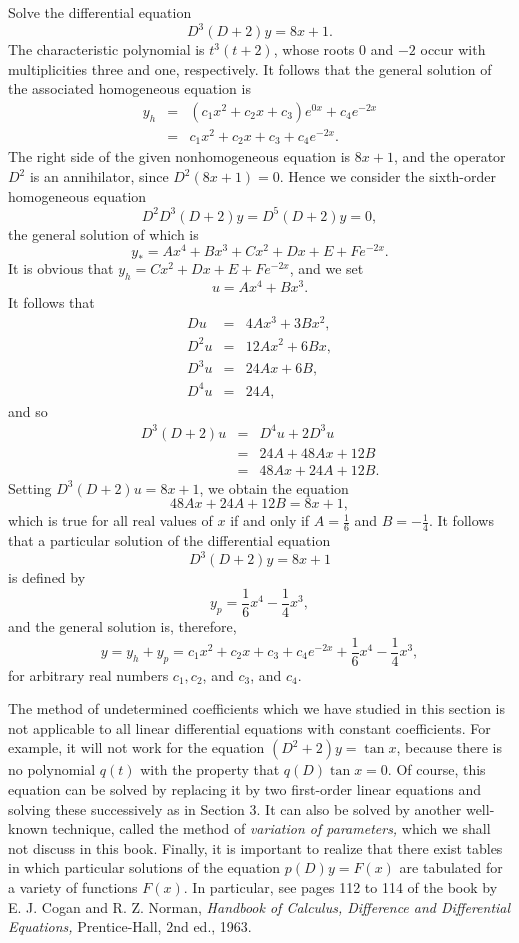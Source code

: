 \begin{example} Solve the differential equation
$$
D^3(D + 2)y = 8x + 1.
$$
The characteristic polynomial is $t^3(t + 2)$, whose roots 0 and $-2$ occur with multiplicities three and one, respectively. It follows that the general solution of the associated homogeneous equation is
\begin{eqnarray*}
y_h &=& (c_1x^2 + c_2x + c_3)e^{0x} + c_4e^{-2x} \\
       &=& c_1x^2 + c_2x + c_3 + c_4e^{-2x} .
\end{eqnarray*}
The right side of the given nonhomogeneous equation is $8x + 1$, and the operator $D^2$ is an annihilator, since $D^2(8x + 1) = 0$. Hence we consider the sixth-order homogeneous equation
$$
D^2D^3(D + 2)y = D^5(D + 2)y = 0,
$$
the general solution of which is
$$
y_* = Ax^4 + Bx^3 + Cx^2 + Dx + E + Fe^{-2x}.
$$
It is obvious that $y_h = Cx^2 + Dx + E + Fe^{-2x}$, and we set 
$$
u = Ax^4 + Bx^3 .
$$
It follows that 
\begin{eqnarray*}
     Du &=& 4Ax^3 + 3Bx^2, \\
 D^2u &=& 12Ax^2 + 6Bx, \\
 D^3u &=& 24Ax + 6B, \\
 D^4u &=& 24A, 
\end{eqnarray*}
and so
\begin{eqnarray*}
D^3(D + 2)u &=& D^4u + 2D^3u\\
                    &=& 24A + 48Ax + 12B\\
                    &=& 48Ax + 24A + 12B.
\end{eqnarray*}
Setting $D^3(D + 2)u = 8x + 1$, we obtain the equation 
$$
48Ax + 24A + 12B = 8x + 1,
$$
which is true for all real values of $x$ if and only if $A = \frac{1}{6}$ and $B = - \frac{1}{4}$. It follows that a particular solution of the differential equation
$$
D^3(D + 2)y = 8x + 1 
$$
is defined by
$$
y_p = \frac{1}{6}x^4 - \frac{1}{4}x^3,
$$
and the general solution is, therefore,
$$
y = y_h + y_p = c_1x^2 + c_2x + c_3 + c_4e^{-2x} + \frac{1}{6}x^4 - \frac{1}{4}x^3,
$$
for arbitrary real numbers $c_1, c_2$, and $c_3$, and $c_4$.
\end{example}

The method of undetermined coefficients which we have studied in this section is not applicable to all linear differential equations with constant coefficients. For example, it will not work for the equation $(D^2 + 2)y = \tan x$, because there is no polynomial $q(t)$ with the property that $q(D)\tan x = 0$. Of course, this equation can be solved by replacing it by two first-order linear equations and solving these successively as in Section 3. It can also be solved by another well-known technique, called the method of \textit{variation of parameters,} which we shall not discuss in this book. Finally, it is important to realize that there exist tables in which particular solutions of the equation $p(D)y = F(x)$ are tabulated for a variety of functions $F(x)$. In particular, see pages 112 to 114 of the book by E. J. Cogan and R. Z. Norman, \textit{Handbook of Calculus, Difference and Differential Equations,}  Prentice-Hall, 2nd ed., 1963.

